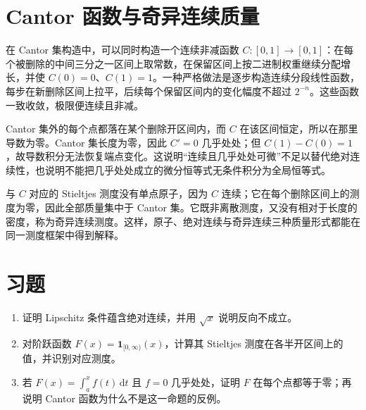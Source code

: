\section{Cantor 函数与奇异连续质量}
在 Cantor 集构造中，可以同时构造一个连续非减函数 $C:[0,1]\to[0,1]$：在每个被删除的中间三分之一区间上取常数，在保留区间上按二进制权重继续分配增长，并使 $C(0)=0$、$C(1)=1$。一种严格做法是逐步构造连续分段线性函数，每步在新删除区间上拉平，后续每个保留区间内的变化幅度不超过 $2^{-n}$。这些函数一致收敛，极限便连续且非减。

Cantor 集外的每个点都落在某个删除开区间内，而 $C$ 在该区间恒定，所以在那里导数为零。Cantor 集长度为零，因此 $C'=0$ 几乎处处；但 $C(1)-C(0)=1$，故导数积分无法恢复端点变化。这说明“连续且几乎处处可微”不足以替代绝对连续性，也说明不能把几乎处处成立的微分恒等式无条件积分为全局恒等式。

与 $C$ 对应的 Stieltjes 测度没有单点原子，因为 $C$ 连续；它在每个删除区间上的测度为零，因此全部质量集中于 Cantor 集。它既非离散测度，又没有相对于长度的密度，称为奇异连续测度。这样，原子、绝对连续与奇异连续三种质量形式都能在同一测度框架中得到解释。

\section{习题}
\begin{enumerate}
 \item 证明 Lipschitz 条件蕴含绝对连续，并用 $\sqrt{x}$ 说明反向不成立。
 \item 对阶跃函数 $F(x)=\mathbf1_{[0,\infty)}(x)$，计算其 Stieltjes 测度在各半开区间上的值，并识别对应测度。
 \item 若 $F(x)=\int_a^xf(t)\,\mathrm dt$ 且 $f=0$ 几乎处处，证明 $F$ 在每个点都等于零；再说明 Cantor 函数为什么不是这一命题的反例。
\end{enumerate}

